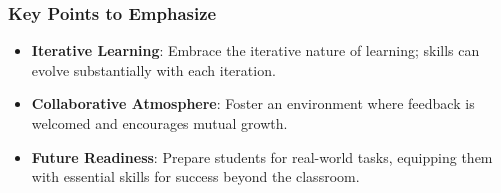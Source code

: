 \documentclass{beamer}
\begin{document}
\begin{frame}[fragile]
    \frametitle{Key Points to Emphasize}
    \begin{itemize}
        \item \textbf{Iterative Learning}: Embrace the iterative nature of learning; skills can evolve substantially with each iteration.
        \item \textbf{Collaborative Atmosphere}: Foster an environment where feedback is welcomed and encourages mutual growth.
        \item \textbf{Future Readiness}: Prepare students for real-world tasks, equipping them with essential skills for success beyond the classroom.
    \end{itemize}
\end{frame}
\end{document}

